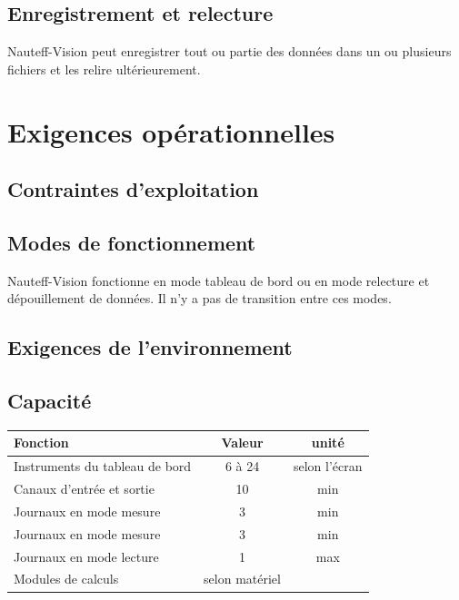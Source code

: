 \documentclass[a4paper,11pt]{report}
\begin{document}
\subsection{Enregistrement et relecture}

Nauteff-Vision peut enregistrer tout ou partie des données
dans un ou plusieurs fichiers et les relire ultérieurement.

\section{Exigences opérationnelles}
\subsection{Contraintes d'exploitation}
\subsection{Modes de fonctionnement}
Nauteff-Vision fonctionne en mode tableau de bord
ou en mode relecture et dépouillement de données.
Il n'y a pas de transition entre ces modes.

\subsection{Exigences de l'environnement}
\subsection{Capacité}

\begin{tabular}{|l|c|c|}
	\hline
    Fonction & Valeur &  unité\\
	\hline
    Instruments du tableau de bord & 6 à 24 &  selon l'écran\\
	\hline
    Canaux d'entrée et sortie & 10 & min\\
    \hline
    Journaux en mode mesure & 3 & min\\
    \hline
    Journaux en mode mesure & 3 & min \\
    \hline
    Journaux en mode lecture & 1 & max\\
    \hline
    Modules de calculs & selon matériel  & \\
    \hline
\end{tabular}
\\
\end{document}
